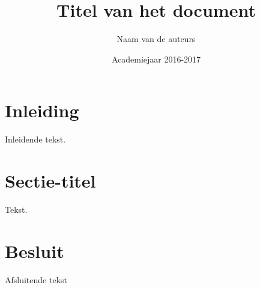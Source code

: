 \documentclass[a4paper,kulak]{kulakarticle}
\date{Academiejaar 2016-2017}
\title{Titel van het document}
\author{Naam van de auteurs}
\begin{document}
\maketitle

\section*{Inleiding}

Inleidende tekst.

\section{Sectie-titel}

Tekst.

\section*{Besluit}

Afsluitende tekst
\end{document}
